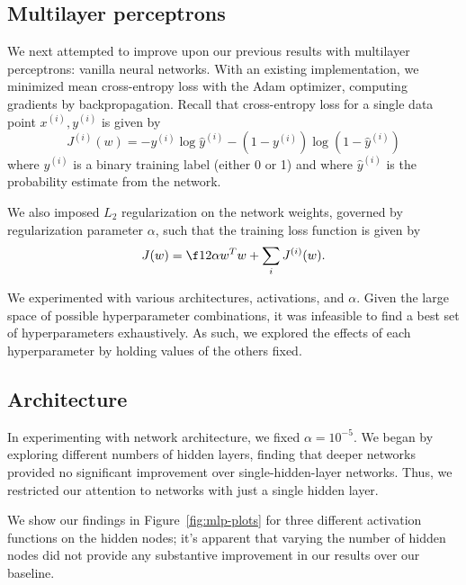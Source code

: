 \documentclass{article}
\newcommand{\sind}[1]{^{(#1)}}
\begin{document}
\begin{multicols}{2}
\section{Multilayer perceptrons}

We next attempted to improve upon our previous results
with multilayer perceptrons:
vanilla neural networks.
With an existing implementation,
we minimized mean cross-entropy loss with the Adam optimizer,
computing gradients by backpropagation.
Recall that cross-entropy loss for a single data point $x\sind{i}, y\sind{i}$
is given by
\begin{equation}
    J\sind{i}(w) = -y\sind{i}\log\hat y\sind{i} - (1-y\sind{i})\log(1-\hat y\sind{i})
\end{equation}
where $y\sind{i}$ is a binary training label (either 0 or 1)
and where $\hat y\sind{i}$ is the probability estimate from the network.

We also imposed $L_2$ regularization on the network weights,
governed by regularization parameter $\alpha$,
such that the training loss function is given by
\begin{equation}
    J(w) = \f12\alpha w^T w + \sum_i J\sind{i}(w).
\end{equation}

We experimented with various architectures, activations, and $\alpha$.
Given the large space of possible hyperparameter combinations,
it was infeasible to find a best set of hyperparameters exhaustively.
As such,
we explored the effects of each hyperparameter
by holding values of the others fixed.

\subsection{Architecture}

In experimenting with network architecture,
we fixed $\alpha = 10^{-5}$.
We began by exploring different numbers of hidden layers,
finding that deeper networks provided no significant improvement
over single-hidden-layer networks.
Thus, we restricted our attention
to networks with just a single hidden layer.

We show our findings in Figure~\ref{fig:mlp-plots}
for three different activation functions on the hidden nodes;
it's apparent that varying the number of hidden nodes
did not provide any substantive improvement in our results
over our baseline.


\end{multicols}
\end{document}
